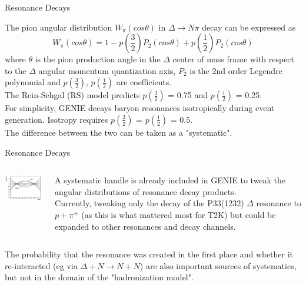\begin{frame}{Resonance Decays}

The pion angular distribution $W_{\pi}(cos\theta)$ in 
$\Delta \rightarrow N \pi$ decay can be expressed as\\
\[
W_{\pi}(cos\theta) = 1 - p(\frac{3}{2}) P_{2}(cos\theta) + p(\frac{1}{2}) P_{2}(cos\theta)
\]
where $\theta$ is the pion production angle in the $\Delta$ 
center of mass frame with respect to the $\Delta$ angular momentum quantization axis, 
$P_{2}$ is the 2nd order Legendre polynomial 
and $p(\frac{3}{2})$, $p(\frac{1}{2})$ are coefficients.\\
\vspace{0.2cm}
The Rein-Sehgal (RS) model predicts $p(\frac{3}{2})$ = 0.75 and $p(\frac{1}{2})$ = 0.25.\\
\vspace{0.2cm}
For simplicity, GENIE decays baryon resonances isotropically during event generation. 
Isotropy requires $p(\frac{3}{2})$ = $p(\frac{1}{2})$ = 0.5.\\
\vspace{0.2cm}
The difference between the two can be taken as a "systematic".
\end{frame}


\begin{frame}{Resonance Decays}

\begin{columns}[T]
  \begin{column}{0.50\textwidth}
    \includegraphics[width=170px]{./images/nuint/dis/res_dec_rewght.png}
  \end{column}
  \begin{column}{0.50\textwidth}
   {\small
     A systematic handle is already included in GENIE to tweak the angular distributions
     of resonance decay products.\\
     Currently, tweaking only the decay of the P33(1232) $\Delta$ resonance to $p+\pi^{+}$
     (as this is what mattered most for T2K) but could be expanded to other resonances and
     decay channels.\\
   }
  \end{column}
\end{columns}
\vspace{0.2cm}
The probability that the resonance was created in the first place and
whether it re-interacted (eg via  $\Delta+N \rightarrow N+N$) are also important
sources of systematics, but not in the domain of the "hadronization model".
\end{frame}


